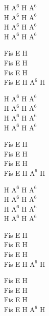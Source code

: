 \begin{chord}
    \begin{smallTwo}
        H $\mathrm{A^{6}}$ H $\mathrm{A^{6}}$\\
        H $\mathrm{A^{6}}$ H $\mathrm{A^{6}}$\\
        H $\mathrm{A^{6}}$ H $\mathrm{A^{6}}$\\
        H $\mathrm{A^{6}}$ H $\mathrm{A^{6}}$

        Fis E H\\
        Fis E H\\
        Fis E H\\
        Fis E H $\mathrm{A^{6}}$ H

        H $\mathrm{A^{6}}$ H $\mathrm{A^{6}}$\\
        H $\mathrm{A^{6}}$ H $\mathrm{A^{6}}$\\
        H $\mathrm{A^{6}}$ H $\mathrm{A^{6}}$\\
        H $\mathrm{A^{6}}$ H $\mathrm{A^{6}}$

        Fis E H\\
        Fis E H\\
        Fis E H\\
        Fis E H $\mathrm{A^{6}}$ H

        H $\mathrm{A^{6}}$ H $\mathrm{A^{6}}$\\
        H $\mathrm{A^{6}}$ H $\mathrm{A^{6}}$\\
        H $\mathrm{A^{6}}$ H $\mathrm{A^{6}}$\\
        H $\mathrm{A^{6}}$ H $\mathrm{A^{6}}$

        Fis E H\\
        Fis E H\\
        Fis E H\\
        Fis E H $\mathrm{A^{6}}$ H

        Fis E H\\
        Fis E H\\
        Fis E H\\
        Fis E H $\mathrm{A^{6}}$ H
\end{smallTwo}
\end{chord}
